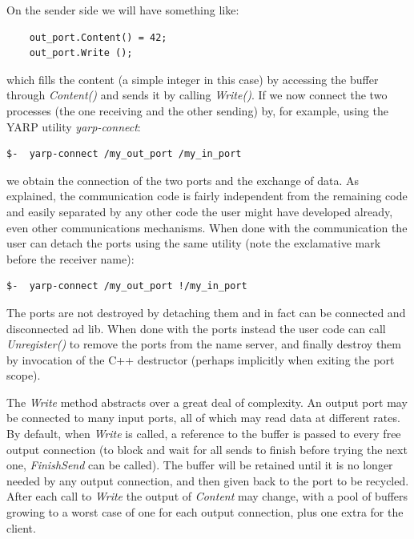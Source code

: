 On the sender side we will have something 
like:

\begin{verbatim}
    out_port.Content() = 42;
    out_port.Write ();

\end{verbatim}

\noindent which fills the content (a simple integer in this case) by
accessing the buffer through {\em Content()} and sends it by calling
{\em Write()}.
%
%
If we now connect the two processes (the one receiving
and the other sending) by, for example, using the YARP utility {\em yarp-connect}:

\begin{verbatim}
$-  yarp-connect /my_out_port /my_in_port    
\end{verbatim}

\noindent we obtain the connection of the two ports and the exchange of data. As explained,
the communication code is fairly independent from the remaining code and easily separated
by any other code the user might have developed already, even other communications 
mechanisms. When done with the communication the user can detach the ports using the same
utility (note the exclamative mark before the receiver name):

\begin{verbatim}
$-  yarp-connect /my_out_port !/my_in_port 
\end{verbatim}

The ports are not destroyed by detaching them and in fact can be connected and disconnected
ad lib. When done with the ports instead the user code can call {\em Unregister()} to 
remove the ports from the name server, and finally destroy them by invocation of the C++
destructor (perhaps implicitly when exiting the port scope).

The {\em Write} method abstracts over a great deal of complexity.
An output port may be connected to many input ports, all of which
may read data at different rates.  By default, when {\em Write}
is called, a reference to the buffer is passed to
every free output connection (to block and wait for all sends to finish before trying the next one, {\em FinishSend} can be called).  The buffer will be retained
until it is no longer needed by any output connection, and then
given back to the port to be recycled.  After each call to
{\em Write} the output of {\em Content} may change, with
a pool of buffers growing to a worst case of one for each
output connection, plus one extra for the client.

